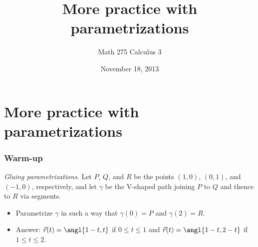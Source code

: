 \documentclass[11pt,ignorenonframetext,aspectratio=169,xcolor={svgnames}]{beamer}
\title{More practice with parametrizations}
\author{Math 275 Calculus 3}
\date{November 18, 2013}
\begin{document}
\frame{\titlepage}

\section{More practice with parametrizations}



\begin{frame}\frametitle{Warm-up}

\emph{Gluing parametrizations}. Let $P$, $Q$, and $R$ be the points
$(1,0)$, $(0,1)$, and $(-1,0)$, respectively, and let $\gamma$ be the
V-shaped path joining $P$ to $Q$ and thence to $R$ via segments.

\begin{itemize}[<+->]
\itemsep1pt\parskip0pt
\item
  Parametrize $\gamma$ in such a way that $\gamma(0) = P$ and
  $\gamma(2) = R$.
\item
  Answer: $\vec{r}(t) = \angl{1-t, t}$ if $0 \leq t \leq 1$ and
  $\vec{r}(t) = \angl{1-t, 2-t}$ if $1 \leq t \leq 2$.
\end{itemize}

\end{frame}
\end{document}
